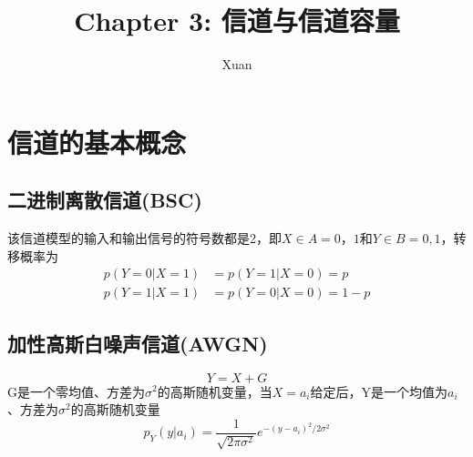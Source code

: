 \documentclass[a4paper, 12pt]{article}
\title{Chapter 3: 信道与信道容量}
\author{Xuan}
\begin{document}
    \maketitle
    \section{信道的基本概念}
    \subsection{二进制离散信道(BSC)}
    该信道模型的输入和输出信号的符号数都是2，即$X\in A={0，1}$和$Y\in B={0, 1}$，转移概率为
    \begin{equation}
        \begin{aligned}
            p(Y=0|X=1)&=p(Y=1|X=0)=p\\
            p(Y=1|X=1)&=p(Y=0|X=0)=1-p
        \end{aligned}
    \end{equation}
    \subsection{加性高斯白噪声信道(AWGN)}
    \[Y=X+G\]
    G是一个零均值、方差为$\sigma^2$的高斯随机变量，当$X=a_i$给定后，Y是一个均值为$a_i$、方差为$\sigma^2$的高斯随机变量
    \[p_Y(y|a_i)=\frac{1}{\sqrt{2\pi\sigma^2}}e^{-(y-a_i)^2/2\sigma^2}\]
\end{document}
